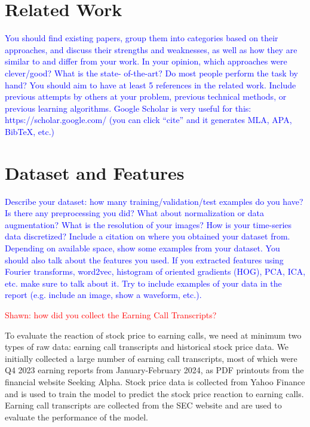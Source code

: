 \documentclass{article}
\newcommand{\note}[1]{\textcolor{blue}{{#1}}}
\newcommand{\TODO}[1]{\textcolor{red}{{#1}}}
\begin{document}
\section{Related Work}
\note{%
You should find existing papers, group them into categories based on their approaches, and discuss their strengths and weaknesses, as well as how they are similar to and differ from your work. In your opinion, which approaches were clever/good? What is the state- of-the-art? Do most people perform the task by hand? You should aim to have at least 5 references in the related work. Include previous attempts by others at your problem, previous technical methods, or previous learning algorithms. Google Scholar is very useful for this: https://scholar.google.com/ (you can click “cite” and it generates MLA, APA, BibTeX, etc.)
}

\section{Dataset and Features}
\note{%
Describe your dataset: how many training/validation/test examples do you have? Is there any preprocessing you did? What about normalization or data augmentation? What is the resolution of your images? How is your time-series data discretized? Include a citation on where you obtained your dataset from. Depending on available space, show some examples from your dataset. You should also talk about the features you used. If you extracted features using Fourier transforms, word2vec, histogram of oriented gradients (HOG), PCA, ICA, etc. make sure to talk about it. Try to include examples of your data in the report (e.g. include an image, show a waveform, etc.).
}

\TODO{Shawn: how did you collect the Earning Call Transcripts?}

To evaluate the reaction of stock price to earning calls, we need at minimum two types of raw data: earning call transcripts and historical stock price data.
We initially collected a large number of earning call transcripts, most of which were Q4 2023 earning reports from January-February 2024, as PDF printouts from the financial website Seeking Alpha.
Stock price data is collected from Yahoo Finance and is used to train the model to predict the stock price reaction to earning calls. Earning call transcripts are collected from the SEC website and are used to evaluate the performance of the model.
\end{document}
